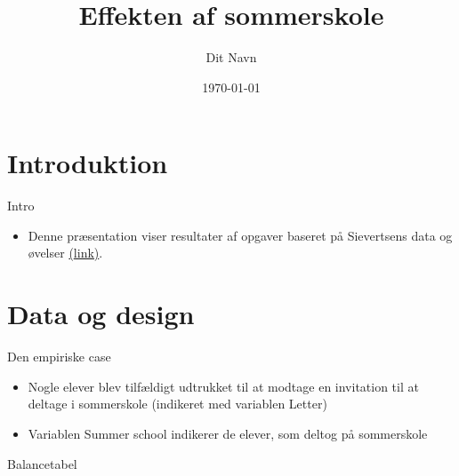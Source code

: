 \documentclass{beamer}
\title{Effekten af sommerskole}
\author{Dit Navn}
\date{\today} %
\institute[AU] %
{\large{Fiktivt datasæt}}
\begin{document}
	
	\begin{frame}[plain]
		\titlepage %
	\end{frame}


\section{Introduktion}

\begin{frame}{Intro}
    \begin{itemize}
        \item Denne præsentation viser resultater af opgaver baseret på Sievertsens data og øvelser \href{https://hhsievertsen.github.io/applied_econ_with_r/}{(\underline{link})}. 
    \end{itemize}
\end{frame}







\section{Data og design}

\begin{frame}{Den empiriske case}
    \begin{itemize}
        \item Nogle elever blev tilfældigt udtrukket til at modtage en invitation til at deltage i sommerskole (indikeret med variablen Letter)
        \item Variablen Summer school indikerer de elever, som deltog på sommerskole
    \end{itemize}
\end{frame}



\begin{frame}{Balancetabel}
    \begin{table}[h] \centering
{}
    \end{table}
\end{frame}
\end{document}
